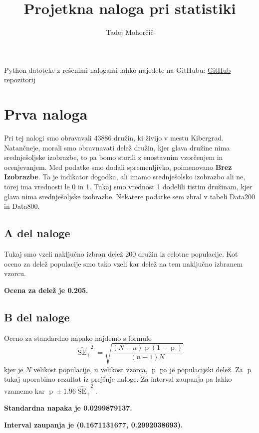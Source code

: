 \documentclass{article}
\title{Projetkna naloga pri statistiki}
\author{Tadej Mohorčič}
\date{}
\DeclareMathOperator{\se}{SE}
\DeclareMathOperator{\de}{p}
\begin{document}
    
    \maketitle

    Python datoteke z rešenimi nalogami lahko najedete na GitHubu: \href{https://github.com/TadejMohorcic/Statistika}{GitHub repozitorij}


    \section{Prva naloga}
    Pri tej nalogi smo obravavali $43886$ družin, ki živijo v mestu Kibergrad. Natančneje, morali smo obravnavati delež družin, kjer glava družine nima srednješoljske izobrazbe,
    to pa bomo storili z enostavnim vzorčenjem in ocenjevanjem. Med podatke smo dodali spremenljivko, poimenovano \textbf{Brez Izobrazbe}. Ta je indikator dogodka, ali imamo
    srednješolsko izobrazbo ali ne, torej ima vrednosti le 0 in 1. Tukaj smo vrednost 1 dodelili tistim družinam, kjer glava nima srednješoljske izobrazbe. Nekatere podatke sem
    zbral v tabeli Data200 in Data800.

    \subsection{A del naloge}
    Tukaj smo vzeli naključno izbran delež 200 družin iz celotne populacije. Kot oceno za delež populacije smo tako vzeli kar delež na tem naključno izbranem vzorcu.
    \par \textbf{Ocena za delež je 0.205.}

    \subsection{B del naloge}
    Oceno za standardno napako najdemo s formulo
    \[
        {\widehat{\se}_{+}}^2 = \sqrt{\frac{(N - n)\de(1 - \de)}{(n - 1)N}}
    \]
    kjer je $N$ velikost populacije, $n$ velikost vzorca, $\de$ pa je populacijski delež. Za $\de$ tukaj uporabimo rezultat iz prejšnje naloge. Za interval zaupanja pa lahko
    vzamemo kar $\de \pm 1.96{\widehat{\se}_{+}}^2$.
    \par \textbf{Standardna napaka je 0.0299879137.}
    \par \textbf{Interval zaupanja je (0.1671131677, 0.2992038693).}
\end{document}
